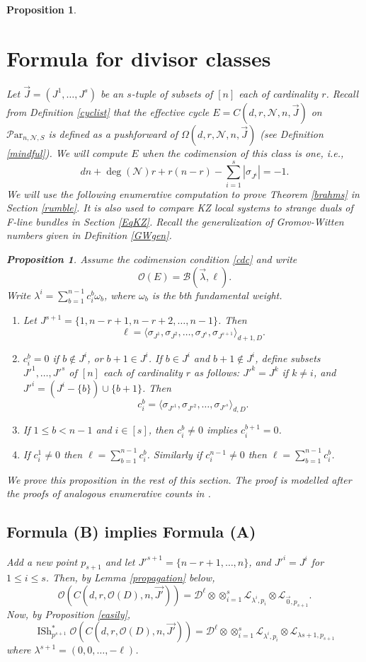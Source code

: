 \documentclass[11pt]{amsart}
\newcommand\tensor{\otimes}
\newcommand\ml{\mathcal{L}}
\newcommand\mn{\mathcal{N}}
\newcommand\Par{\mathcal{P}\text{ar} }
\newtheorem{proposition}[theorem]{Proposition}
\numberwithin{theorem}{subsection}
\begin{document}
{\begin{proposition}
\section{Formula for divisor classes}\label{enume}
Let $\vec{J}=(J^1,\dots,J^s)$ be an $s$-tuple of subsets  of $[n]$ each of cardinality $r$. Recall from Definition \ref{cyclist} that the effective cycle $E=C(d,r,\mn,n,\vec{J})$ on $\Par_{n,\mn,S}$ is defined as a pushforward of
$\Omega(d,r,\mn,n,\vec{J})$ (see Definition  \ref{mindful}).  We will compute $E$ when the codimension of this class is one, i.e.,
\begin{equation}\label{cdc}
dn +\deg(\mn)r +r(n-r)-\sum_{i=1}^s |\sigma_{J^i}|=-1.
\end{equation}
We will use the following enumerative computation to prove Theorem \ref{brahms} in Section \ref{rumble}. It is also used to compare KZ local systems to strange duals of F-line bundles in Section \ref{EqKZ}. Recall the generalization of Gromov-Witten numbers given in  Definition \ref{GWgen}.
\begin{proposition}\label{enumerative}
Assume the codimension condition \eqref{cdc} and
write
$$\mathcal{O}(E)=\mathcal{B}(\vec{\lambda},\ell).$$
Write $\lambda^i=\sum_{b=1}^{n-1} c_{i}^{b}\omega_b$, where $\omega_b$ is the $b$th fundamental weight.
\begin{enumerate}
\item[(A)] Let $J^{s+1}=\{1,n-r+1,n-r+2,\dots,n-1\}$. Then
$$\ell=\langle\sigma_{J^1}, \sigma_{J^2},\dots,\sigma_{J^s},\sigma_{J^{s+1}}\rangle_{d+1,D}.$$
\item[(B)] $c_{i}^{b}=0$ if $b\not\in J^i$, or $b+1\in J^i$. If $b\in J^i$ and $b+1\not\in J^i$, define subsets $J'^1,\dots,J'^s$ of $[n]$
 each of cardinality $r$ as follows: $J'^k=J^k$ if $k\neq i$, and $J'^i=(J^i-\{b\})\cup \{b+1\}$. Then
$$c_i^{b}= \langle\sigma_{J'^1}, \sigma_{J'^2},\dots,\sigma_{J'^s}\rangle_{d,D}.$$
\item[(C)] If $1\leq b<n-1$ and $i\in[s]$, then $c^b_i\neq 0$ implies $c^{b+1}_i=0$.
\item[(D)] If $c^1_i\neq 0$ then $\ell=\sum_{b=1}^{n-1} c^b_i$.  Similarly if $c^{n-1}_i\neq 0$ then $\ell=\sum_{b=1}^{n-1} c^b_i$.
\end{enumerate}
\end{proposition}
We prove this proposition in the rest of this section. The  proof is modelled after the proofs of analogous enumerative counts in \cite{BHermit,BKiers,Kiers}.
\subsection{Formula (B) implies Formula (A)}
Add a new point $p_{s+1}$ and let $J'^{s+1}=\{n-r+1,\dots, n\}$, and $J'^i=J^i$ for $1\leq i \leq s$. Then, by Lemma \ref{propagation} below,
$$\mathcal{O}(C(d,r,\mathcal{O}(D),n,\vec{J'}))=\mathcal{D}^{\ell}\tensor\tensor_{i=1}^s\ml_{\lambda^i,p_i}\tensor \ml_{\vec{0},p_{s+1}}.$$
Now, by Proposition \ref{easily},
$$\operatorname{ISh}_{p^{s+1}}^*\mathcal{O}(C(d,r,\mathcal{O}(D),n,\vec{J'}))=\mathcal{D}^{\ell}\tensor\tensor_{i=1}^s\ml_{\lambda^i,p_i}\tensor\ml_{\lambda{s+1},p_{s+1}}$$
where $\lambda^{s+1}=(0,0,\dots,-\ell)$.


\end{proposition}}
\end{document}
